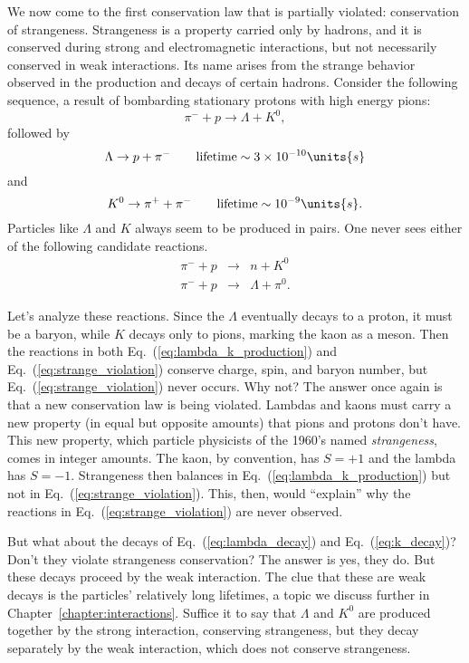We now come to the first conservation law that is partially violated:
conservation of strange\-ness.  Strange\-ness is a property carried
only by hadrons, and it is conserved during strong and electromagnetic
interactions, but not necessarily conserved in weak interactions.
Its name arises from the strange behavior observed in the production and
decays of certain hadrons.  Consider the following sequence, a result
of bombarding stationary protons with high energy pions:
\begin{equation}
\pi^- + p \to \Lambda + K^0,
\label{eq:lambda_k_production}
\end{equation}
followed by
\begin{equation}
\Lambda \to p + \pi^- \qquad \mbox{lifetime} \sim 3\times 10^{-10}\units{s}
\label{eq:lambda_decay}
\end{equation}
and
\begin{equation}
K^0 \to \pi^+ + \pi^- \qquad \mbox{lifetime} \sim 10^{-9}\units{s}.
\label{eq:k_decay}
\end{equation}
Particles like $\Lambda$ and $K$ always seem to be produced in pairs.
One never sees either of the following candidate reactions.
\begin{eqnarray}
\pi^- + p &\to& n + K^0 \nonumber\\
\pi^- + p &\to& \Lambda + \pi^0.
\label{eq:strange_violation}
\end{eqnarray}

Let's analyze these reactions.  Since the $\Lambda$ eventually decays
to a proton, it must be a baryon, while $K$ decays only to pions,
marking the kaon as a meson.  Then the reactions in both
Eq.~(\ref{eq:lambda_k_production}) and
Eq.~(\ref{eq:strange_violation}) conserve charge, spin, and baryon
number, but Eq.~(\ref{eq:strange_violation}) never occurs.  Why not?
The answer once again is that a new conservation law is being
violated.  Lambdas and kaons must carry a new property (in equal but
opposite amounts) that pions and protons don't have.  This new
property, which particle physicists of the 1960's named {\em
strange\-ness}, comes in integer amounts.  The kaon, by convention, has
$S = +1$ and the lambda has $S = -1$.  Strange\-ness then balances in
Eq.~(\ref{eq:lambda_k_production}) but not in
Eq.~(\ref{eq:strange_violation}).  This, then, would ``explain'' why
the reactions in Eq.~(\ref{eq:strange_violation}) are never observed.

But what about the decays of Eq.~(\ref{eq:lambda_decay}) and
Eq.~(\ref{eq:k_decay})?  Don't they violate strange\-ness
conservation?  The answer is yes, they do.  But these decays proceed
by the weak interaction.  The clue that these are weak decays is the
particles' relatively long lifetimes, a topic we discuss further in
Chapter~\ref{chapter:interactions}.  Suffice it to say that $\Lambda$
and $K^0$ are produced together by the strong interaction, conserving
strange\-ness, but they decay separately by the weak interaction,
which does not conserve strange\-ness.

